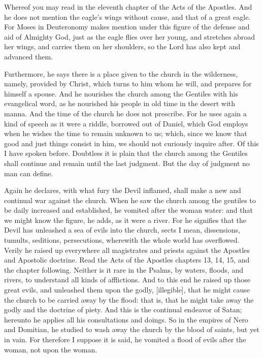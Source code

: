 Whereof you may read in the eleventh chapter of the Acts of the Apostles. And he does not mention the eagle’s wings without cause, and that of a great eagle. For Moses in Deuteronomy makes mention under this figure of the defense and aid of Almighty God, just as the eagle flies over her young, and stretches abroad her wings, and carries them on her shoulders, so the Lord has also kept and advanced them.

Furthermore, he says there is a place given to the church in the wilderness, namely, provided by Christ, which turns to him whom he will, and prepares for himself a spouse. And he nourishes the church among the Gentiles with his evangelical word, as he nourished his people in old time in the desert with manna. And the time of the church he does not prescribe. For he uses again a kind of speech as it were a riddle, borrowed out of Daniel, which God employs when he wishes the time to remain unknown to us; which, since we know that good and just things consist in him, we should not curiously inquire after. Of this I have spoken before. Doubtless it is plain that the church among the Gentiles shall continue and remain until the last judgment. But the day of judgment no man can define.

Again he declares, with what fury the Devil inflamed, shall make a new and continual war against the church. When he saw the church among the gentiles to be daily increased and established, he vomited after the woman water: and that we might know the figure, he adds, as it were a river. For he signifies that the Devil has unleashed a sea of evils into the church, sects I mean, dissensions, tumults, seditions, persecutions, wherewith the whole world has overflowed. Verily he raised up everywhere all magistrates and priests against the Apostles and Apostolic doctrine. Read the Acts of the Apostles chapters 13, 14, 15, and the chapter following. Neither is it rare in the Psalms, by waters, floods, and rivers, to understand all kinds of afflictions. And to this end he raised up those great evils, and unleashed them upon the godly, [illegible], that he might cause the church to be carried away by the flood: that is, that he might take away the godly and the doctrine of piety. And this is the continual endeavor of Satan; hereunto he applies all his consultations and doings. So in the empires of Nero and Domitian, he studied to wash away the church by the blood of saints, but yet in vain. For therefore I suppose it is said, he vomited a flood of evils after the woman, not upon the woman.

